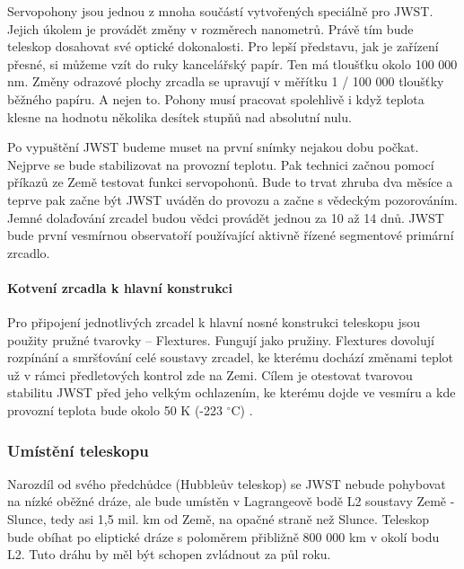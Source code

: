\documentclass[a4paper,11pt]{article}
\begin{document}
Servopohony jsou jednou z mnoha součástí vytvořených speciálně pro JWST. Jejich úkolem je provádět změny v rozměrech nanometrů. Právě tím bude teleskop dosahovat své optické dokonalosti. Pro lepší představu, jak je zařízení přesné, si můžeme vzít do ruky kancelářský papír. Ten má  tloušťku okolo  100 000 nm. Změny odrazové plochy zrcadla se upravují v měřítku  1 / 100 000 tloušťky běžného papíru. A nejen to. Pohony musí pracovat spolehlivě i když teplota klesne na hodnotu několika desítek stupňů nad absolutní nulu.

Po vypuštění JWST budeme muset na první snímky nejakou dobu počkat. Nejprve se bude  stabilizovat na provozní teplotu. Pak technici začnou pomocí příkazů ze Země testovat funkci servopohonů. Bude to trvat zhruba dva měsíce a teprve pak začne být JWST uváděn do provozu a začne s vědeckým pozorováním. Jemné dolaďování zrcadel budou vědci provádět jednou za 10 až 14 dnů. JWST bude první vesmírnou observatoří používající aktivně řízené segmentové primární zrcadlo.

\paragraph{Kotvení zrcadla k hlavní konstrukci}
Pro připojení jednotlivých zrcadel k hlavní nosné konstrukci teleskopu jsou použity pružné tvarovky – Flextures. Fungují jako pružiny. Flextures dovolují rozpínání a smršťování celé soustavy zrcadel, ke kterému dochází změnami teplot  už v rámci předletových kontrol zde na Zemi. Cílem je otestovat tvarovou stabilitu JWST před jeho velkým ochlazením, ke kterému dojde ve vesmíru a kde provozní teplota bude okolo 50 K (-223 $^\circ$C) \cite{osel}.

\subsubsection{Umístění teleskopu}
Narozdíl od svého předchůdce (Hubbleův teleskop) se JWST nebude pohybovat na nízké oběžné dráze, ale bude umístěn v Lagrangeově bodě L2 soustavy Země - Slunce, tedy asi 1,5 mil. km od Země, na opačné straně než Slunce. Teleskop bude obíhat po eliptické dráze s poloměrem přibližně 800 000 km v okolí bodu L2. Tuto dráhu by měl být schopen zvládnout za půl roku.
\end{document}
